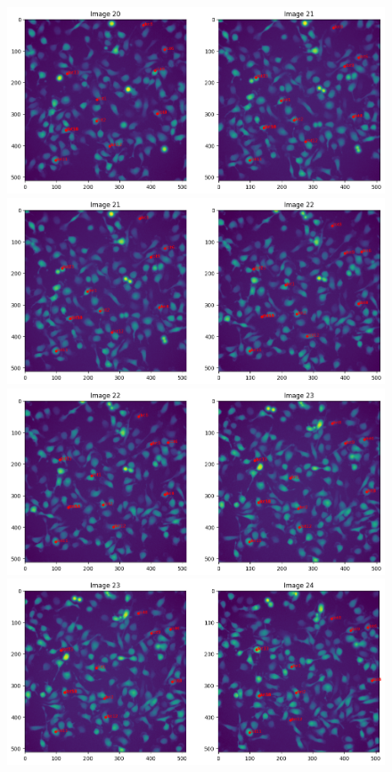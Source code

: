 \documentclass{article}
\begin{document}
\begin{figure}[h!]
\centering
\includegraphics[width=0.75\linewidth]{Report/RImages/Traces_Growth/trace-b21.png}
\includegraphics[width=0.75\linewidth]{Report/RImages/Traces_Growth/trace-b22.png}
\includegraphics[width=0.75\linewidth]{Report/RImages/Traces_Growth/trace-b23.png}
\includegraphics[width=0.75\linewidth]{Report/RImages/Traces_Growth/trace-b24.png}
\end{figure}

\clearpage
\end{document}
